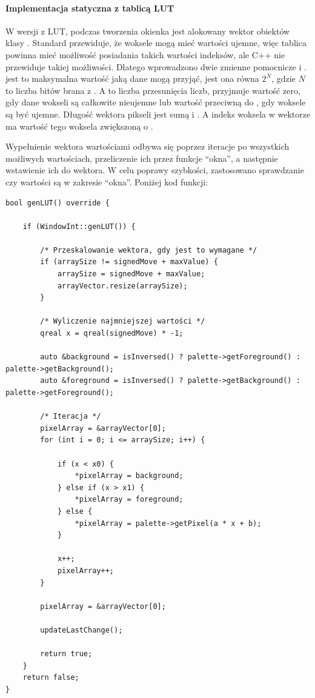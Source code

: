 \paragraph{Implementacja statyczna z tablicą LUT}
\par
W wersji z LUT, podczas tworzenia okienka jest alokowany wektor obiektów  klasy .
Standard \DICOM przewiduje, że woksele mogą mieć wartości ujemne, więc tablica powinna mieć możliwość posiadania takich wartości indeksów, ale C++ nie przewiduje takiej możliwości.
Dlatego wprowadzono dwie zmienne pomocnicze  i .
 jest to maksymalna wartość jaką dane mogą przyjąć, jest ona równa $2^N$, gdzie $N$ to liczba bitów brana z .
A  to liczba przesunięcia liczb, przyjmuje wartość zero, gdy dane wokseli są całkowite nieujemne lub wartość przeciwną do , gdy woksele są być ujemne.
Długość wektora pikseli jest sumą  i .
A indeks woksela w wektorze ma wartość tego woksela zwiększoną o .
\par
Wypełnienie wektora wartościami odbywa się poprzez iteracje po wszystkich możliwych wartościach, przeliczenie ich przez funkcje \enquote{okna}, a następnie wstawienie ich do wektora.
W celu poprawy szybkości, zastosowano sprawdzanie czy wartości są w zakresie \enquote{okna}.
Poniżej kod funkcji:
\begin{lstlisting}
bool genLUT() override {

    if (WindowInt::genLUT()) {

        /* Przeskalowanie wektora, gdy jest to wymagane */
        if (arraySize != signedMove + maxValue) {
            arraySize = signedMove + maxValue;
            arrayVector.resize(arraySize);
        }

        /* Wyliczenie najmniejszej wartości */
        qreal x = qreal(signedMove) * -1;

        auto &background = isInversed() ? palette->getForeground() : palette->getBackground();
        auto &foreground = isInversed() ? palette->getBackground() : palette->getForeground();

        /* Iteracja */
        pixelArray = &arrayVector[0];
        for (int i = 0; i <= arraySize; i++) {

            if (x < x0) {
                *pixelArray = background;
            } else if (x > x1) {
                *pixelArray = foreground;
            } else {
                *pixelArray = palette->getPixel(a * x + b);
            }

            x++;
            pixelArray++;
        }

        pixelArray = &arrayVector[0];

        updateLastChange();

        return true;
    }
    return false;
}
\end{lstlisting}

